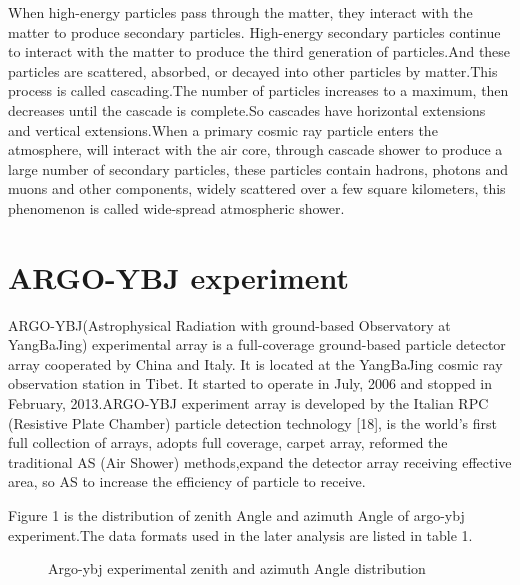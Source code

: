 \documentclass{aastex62}
\begin{document}
When high-energy particles pass through the matter, they interact with the matter to produce secondary particles. High-energy secondary particles continue to interact with the matter to produce the third generation of particles.And these particles are scattered, absorbed, or decayed into other particles by matter.This process is called cascading.The number of particles increases to a maximum, then decreases until the cascade is complete.So cascades have horizontal extensions and vertical extensions.When a primary cosmic ray particle enters the atmosphere, will interact with the air core, through cascade shower to produce a large number of secondary particles, these particles contain hadrons, photons and muons and other components, widely scattered over a few square kilometers, this phenomenon is called wide-spread atmospheric shower.

\section{ARGO-YBJ experiment}
ARGO-YBJ(Astrophysical Radiation with ground-based Observatory at YangBaJing) experimental array is a full-coverage ground-based particle detector array cooperated by China and Italy. It is located at the YangBaJing cosmic ray observation station in Tibet. It started to operate in July, 2006 and stopped in February, 2013.ARGO-YBJ experiment array is developed by the Italian RPC (Resistive Plate Chamber) particle detection technology [18], is the world's first full collection of arrays, adopts full coverage, carpet array, reformed the traditional AS (Air Shower) methods,expand the detector array receiving effective area, so AS to increase the efficiency of particle to receive.

Figure 1 is the distribution of zenith Angle and azimuth Angle of argo-ybj experiment.The data formats used in the later analysis are listed in table 1.

\begin{figure}
\caption{Argo-ybj experimental zenith and azimuth Angle distribution\label{fig:f2}}
\end{figure}
\end{document}
